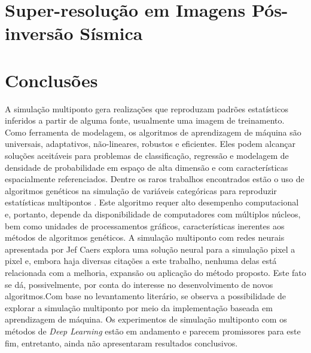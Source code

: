 \documentclass[11pt]{article}
\begin{document}
\section{Super-resolução em Imagens Pós-inversão Sísmica}


\section{Conclusões}
A simulação multiponto gera realizações que reproduzam padrões estatísticos inferidos a partir de alguma fonte, usualmente uma imagem de treinamento. 
Como ferramenta de modelagem, os algoritmos de aprendizagem de máquina são universais, adaptativos, não-lineares, robustos e eficientes. 
Eles podem alcançar soluções aceitáveis para problemas de classificação, regressão e modelagem de densidade de probabilidade em espaço de alta dimensão 
e com características espacialmente referenciados. Dentre os raros trabalhos encontrados estão o uso de algoritmos genéticos na simulação de variáveis
categóricas para reproduzir estatísticas multipontos \cite{Peredo2012}. Este algoritmo 
requer alto desempenho computacional e, portanto, depende da disponibilidade de computadores com múltiplos núcleos, bem como unidades de processamentos 
gráficos, características inerentes aos métodos de algoritmos genéticos. A simulação multiponto com redes neurais apresentada por Jef Caers \cite{caers_1998} explora uma 
solução neural para a simulação pixel a pixel e, embora haja diversas citações a este trabalho, nenhuma delas está relacionada com a melhoria, expansão 
ou aplicação do método proposto. Este fato se dá, possivelmente, por conta do interesse no desenvolvimento de novos algoritmos.Com base no levantamento literário, se observa a possibilidade de explorar a simulação multiponto por meio da 
implementação baseada em aprendizagem de máquina. Os experimentos de simulação multiponto com os métodos de \textit{Deep Learning} estão em andamento e
parecem promissores para este fim, entretanto, ainda não apresentaram resultados conclusivos.

\nocite{*}

\begin{spacing}{1}
   
   
 \end{spacing}
\end{document}
